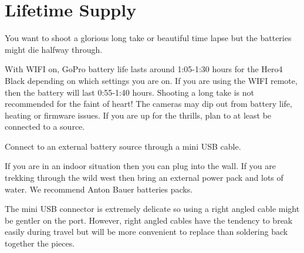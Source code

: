 \chapter{Lifetime Supply}
\pagecolor{white}
\label{chap:8}
\begin{fullwidth}


\problem

{\large You want to shoot a glorious long take or beautiful time lapse but the batteries might die halfway through. 
 \par}

With WIFI on, GoPro battery life lasts around 1:05-1:30 hours for the Hero4 Black depending on which settings you are on. If you are using the WIFI remote, then the battery will last 0:55-1:40 hours. Shooting a long take is not recommended for the faint of heart! The cameras may dip out from battery life, heating or firmware issues. If you are up for the thrills, plan to at least be connected to a source. 


\solution

{\large Connect to an external battery source through a mini USB cable. 

 \par}

If you are in an indoor situation then you can plug into the wall. If you are trekking through the wild west then bring an external power pack and lots of water. We recommend Anton Bauer batteries packs.


\tip The mini USB connector is extremely delicate so using a right angled cable might be gentler on the port. However, right angled cables have the tendency to break easily during travel but will be more convenient to replace than soldering back together the pieces. 





\clearpage
\end{fullwidth}
